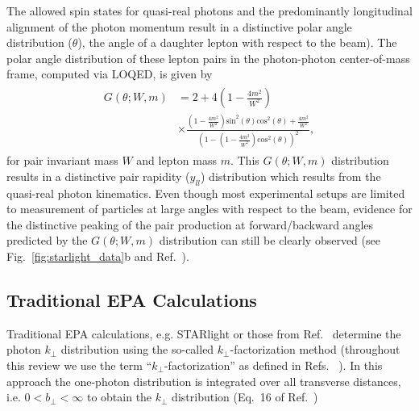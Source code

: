 \documentclass[twocolumn,epjc3]{svjour3}\sloppy
\begin{document}
The allowed spin states for quasi-real photons and the predominantly longitudinal alignment of the photon momentum result in a distinctive polar angle distribution ($\theta$), the angle of a daughter lepton with respect to the beam). The polar angle distribution of these lepton pairs in the photon-photon center-of-mass frame, computed via LOQED, is given by~\cite{brodskyTwoPhotonMechanismParticle1971a}
\begin{align}
    \begin{split}
  G(\theta; W, m) & = 2 + 4(1-\frac{4m^{2}}{W^{2}})  \\
  & \times \frac{(1-\frac{4m^{2}}{W^{2}})\text{sin}^{2}(\theta)\text{cos}^{2}(\theta)+\frac{4m^{2}}{W^{2}}}{(1-(1-\frac{4m^{2}}{W^{2}})\text{cos}^{2}(\theta))^{2}},
  \label{eq:Gtheta}
  \end{split}
\end{align}
for pair invariant mass $W$ and lepton mass $m$. This $G(\theta; W, m)$ distribution results in a distinctive pair rapidity ($y_{ll}$) distribution which results from the quasi-real photon kinematics. Even though most experimental setups are limited to measurement of particles at large angles with respect to the beam, evidence for the distinctive peaking of the pair production at forward/backward angles predicted by the $G(\theta; W, m)$ distribution can still be clearly observed (see Fig.~\ref{fig:starlight_data}b and Ref.~\cite{starcollaborationMeasurementMomentumAngular2021}).

\subsection{Traditional EPA Calculations}
Traditional EPA calculations, e.g. STARlight or those from Ref.~\cite{klusek-gawendaDileptonRadiationHeavyIon2019} determine the photon $k_\perp$ distribution using the so-called $k_\perp$-factorization method (throughout this review we use the term ``$k_\perp$-factorization'' as defined in Refs. ~\cite{klusek-gawendaDileptonRadiationHeavyIon2019,klusek-gawendaCentralityDependenceDilepton2021}). In this approach the one-photon distribution is integrated over all transverse distances, i.e. $0 < b_\perp < \infty$ to obtain the $k_\perp$ distribution (Eq.~16 of Ref.~\cite{kleinSTARlightMonteCarlo2017b})
\end{document}
